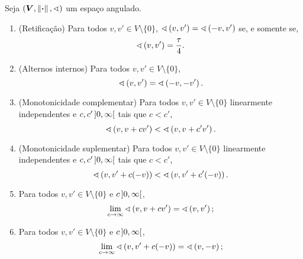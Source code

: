 \cleardoublepage


\begin{proposition}
Seja $(\bm V, \left\Vert{\bm{\cdot}}\right\Vert,\sphericalangle)$ um espaço angulado.
	\begin{enumerate}
		\item (Retificação) Para todos $v,v' \in V \setminus \{0\}$, $\sphericalangle\left({v},{v'}\right)=\sphericalangle\left({-v},{v'}\right)$ se, e somente se,
			\begin{equation*}
				\sphericalangle\left({v},{v'}\right) = \frac{\tau}{4}.
			\end{equation*}

		\item (Alternos internos) Para todos $v,v' \in V \setminus \{0\}$,
			\begin{equation*}
				\sphericalangle\left({v},{v'}\right) = \sphericalangle\left({-v},{-v'}\right).
			\end{equation*}

		\item (Monotonicidade complementar) Para todos $v,v' \in V \setminus \{0\}$ linearmente independentes e $c,c' \left]0,\allowbreak \infty\right[$ tais que $c < c'$,
		\begin{equation*}
			\sphericalangle\left({v},{v+cv'}\right) < \sphericalangle\left({v},{v+c'v'}\right).
		\end{equation*}

		\item (Monotonicidade suplementar) Para todos $v,v' \in V \setminus \{0\}$ linearmente independentes e $c,c' \left]0,\allowbreak \infty\right[$ tais que $c < c'$,
			\begin{equation*}
				\sphericalangle\left({v},{v'+c(-v)}\right) < \sphericalangle\left({v},{v'+c'(-v)}\right).
			\end{equation*}

		\item Para todos $v,v' \in V \setminus \{0\}$ e $c \left]0,\allowbreak \infty\right[$,
			\begin{equation*}
				\lim_{c \to \infty} \sphericalangle\left({v},{v+cv'}\right) = \sphericalangle\left({v},{v'}\right);
			\end{equation*}
		\item Para todos $v,v' \in V \setminus \{0\}$ e $c \left]0,\allowbreak \infty\right[$,
		\begin{equation*}
			\lim_{c \to \infty} \sphericalangle\left({v},{v'+c(-v)}\right) = \sphericalangle\left({v},{-v}\right);
		\end{equation*}


\end{enumerate}
\end{proposition}
